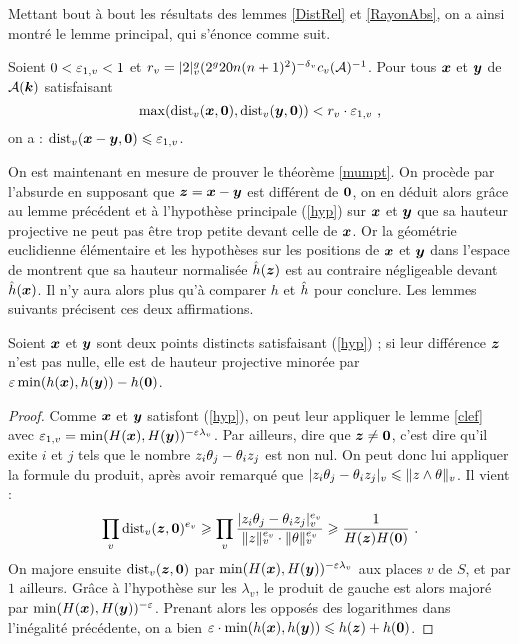 \documentclass{mpg-preth}
\begin{document}
Mettant bout à bout les résultats des lemmes \ref{DistRel} et \ref{RayonAbs},
on a ainsi montré le lemme principal, qui s'énonce comme suit.

\begin{lem} \label{clef}
  Soient $0 < \varepsilon_{1,v} < 1$ et $r_v = \lvert2\rvert_{v}^g
  (2^g20n(n+1)^2)^{-{\delta\smash{_v}}}c_v(\mathcal{A})^{-1}$. Pour tous ${\boldsymbol{x}}$ et ${\boldsymbol{y}}$ de
  $\mathcal{A}(\boldsymbol{k})$ satisfaisant
  \[
  \max ( \mathrm{dist}_v({\boldsymbol{x}}, {\boldsymbol{0}}), \mathrm{dist}_v({\boldsymbol{y}}, {\boldsymbol{0}}) ) < r_v \cdot \varepsilon_{1,v} \text{ ,}
  \]
  on a : $\mathrm{dist}_v({\boldsymbol{x}}-{\boldsymbol{y}}, {\boldsymbol{0}}) \leqslant \varepsilon_{1,v}$.
\end{lem}

On est maintenant en mesure de prouver le théorème \ref{mumpt}. On procède par
l'absurde en supposant que ${\boldsymbol{z}} = {\boldsymbol{x}} - {\boldsymbol{y}}$ est différent de ${\boldsymbol{0}}$, on
en déduit alors grâce au lemme précédent et à l'hypothèse principale
(\ref{hyp}) sur ${\boldsymbol{x}}$ et ${\boldsymbol{y}}$ que sa hauteur projective ne peut pas être
trop petite devant celle de ${\boldsymbol{x}}$. Or la géométrie euclidienne élémentaire
et les hypothèses sur les positions de ${\boldsymbol{x}}$ et ${\boldsymbol{y}}$ dans l'espace de
 montrent que sa hauteur normalisée $\hat{h}({\boldsymbol{z}})$ est au
contraire négligeable devant $\hat{h}({\boldsymbol{x}})$. Il n'y aura alors plus qu'à
comparer $h$ et $\hat{h}$ pour conclure. Les lemmes suivants précisent ces deux
affirmations.

\begin{lem} \label{papti}
  Soient ${\boldsymbol{x}}$ et ${\boldsymbol{y}}$ sont deux points distincts satisfaisant
  (\ref{hyp}) ; si leur différence ${\boldsymbol{z}}$ n'est pas nulle, elle est de hauteur
  projective minorée par $\varepsilon \min(h({\boldsymbol{x}}), h({\boldsymbol{y}})) - h({\boldsymbol{0}})$.
\end{lem}

\begin{proof}
  Comme ${\boldsymbol{x}}$ et ${\boldsymbol{y}}$ satisfont (\ref{hyp}), on peut leur appliquer le
  lemme \ref{clef} avec $\varepsilon_{1, v} = \min(H({\boldsymbol{x}}),
  H({\boldsymbol{y}}))^{-\varepsilon\lambda_v}$. Par ailleurs, dire que ${\boldsymbol{z}} \neq {\boldsymbol{0}}$, c'est
  dire qu'il exite $i$ et $j$ tels que le nombre $z_i \theta_j - \theta_i z_j$ est
  non nul. On peut donc lui appliquer la formule du produit, après avoir
  remarqué que $\lvert z_i \theta_j - \theta_i z_j\rvert_{v} \leqslant \lVert z\wedge \theta\rVert_{v}$. Il vient
  :
  \[
  \prod_v \mathrm{dist}_v({\boldsymbol{z}}, {\boldsymbol{0}})^{e_v} \geqslant \prod_v \frac{\lvert z_i \theta_j - \theta_i
    z_j\rvert_{v}^{e_v}}{\lVert z\rVert_{v}^{e_v}\cdot\lVert\theta\rVert_{v}^{e_v}} \geqslant \frac{1}{H({\boldsymbol{z}})
    H({\boldsymbol{0}})} \text{ .}
  \]
  On majore ensuite $\mathrm{dist}_v({\boldsymbol{z}}, {\boldsymbol{0}})$ par $\min(H({\boldsymbol{x}}),
  H({\boldsymbol{y}}))^{-\varepsilon\lambda_v}$ aux places $v$ de $S$, et par $1$ ailleurs.
  Grâce à l'hypothèse sur les $\lambda_v$, le produit de gauche est alors
  majoré par $\min(H({\boldsymbol{x}}), H({\boldsymbol{y}}))^{-\varepsilon}$. Prenant alors les opposés des
  logarithmes dans l'inégalité précédente, on a bien $\varepsilon \cdot
  \min(h({\boldsymbol{x}}), h({\boldsymbol{y}})) \leqslant h({\boldsymbol{z}}) + h({\boldsymbol{0}})$.
\end{proof}
\end{document}
